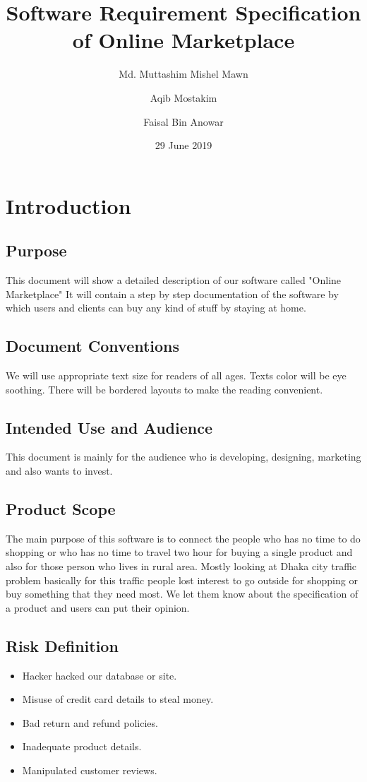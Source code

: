 \documentclass{article}
\title{Software Requirement Specification of Online Marketplace}
\author{Md. Muttashim Mishel Mawn \and Aqib Mostakim \and Faisal Bin Anowar}
\date{29 June 2019}
\begin{document}
\tableofcontents
\clearpage
\maketitle

\section{Introduction}
\subsection{Purpose}
This document will show a detailed description of our software called "Online Marketplace" It will contain a step by step documentation of the software by which users and clients can buy any kind of stuff by staying at home.
\subsection{Document Conventions}
We will use appropriate text size for readers of all ages. Texts color will be eye soothing. There will be bordered layouts to make the reading convenient.
\subsection{Intended Use and Audience}
This document is mainly for the audience who is developing, designing, marketing and also wants to invest.
\subsection{Product Scope}
The main purpose of this software is to connect the people who has no time to do shopping or who has no time to travel two hour for buying a single product and also for those person who lives in rural area. Mostly looking at Dhaka city traffic problem basically for this traffic people lost interest to go outside for shopping or buy something that they need most. We let them know about the specification of a product and users can put their opinion.
\subsection{Risk Definition}
\begin{itemize}
\item Hacker hacked our database or site.
\item Misuse of credit card details to steal money.
\item Bad return and refund policies. 
\item Inadequate product details.
\item Manipulated customer reviews.
\end{itemize}
\end{document}
